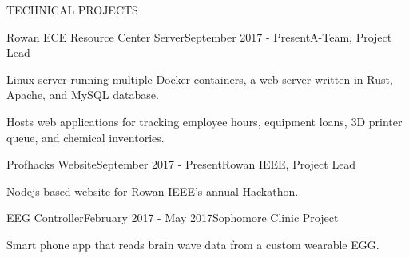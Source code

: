 \documentclass{resume} %
\begin{document}
\begin{rSection}{TECHNICAL PROJECTS}
\begin{rSubsection}{Rowan ECE Resource Center Server}{September 2017 - Present}{A-Team, Project Lead}{}
\item Linux server running multiple Docker containers, a web server written in
  Rust, Apache, and MySQL database.
\item Hosts web applications for tracking employee hours, equipment loans, 3D printer queue, and chemical inventories.
\end{rSubsection}


\begin{rSubsection}{Profhacks Website}{September 2017 - Present}{Rowan IEEE, Project Lead}{}
\item Nodejs-based website for Rowan IEEE's annual Hackathon.
\end{rSubsection}


%








\begin{rSubsection}{EEG Controller}{February 2017 - May 2017}{Sophomore Clinic Project}{}
\item Smart phone app that reads brain wave data from a custom wearable EGG.
\end{rSubsection}

\end{rSection}
\end{document}
